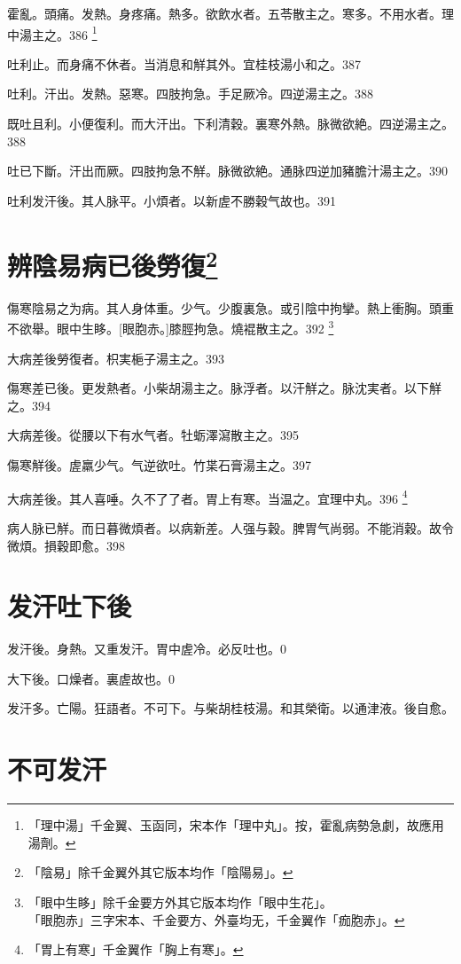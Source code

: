 \documentclass[12pt,twoside,UTF8,b5paper]{ctexbook}
\begin{document}
霍亂。頭痛。发熱。身疼痛。熱多。欲飲水者。五苓散主之。寒多。不用水者。理中湯主之。386
	\footnote{「理中湯」千金翼、玉函同，宋本作「理中丸」。按，霍亂病勢急劇，故應用湯劑。}

吐利止。而身痛不休者。当消息和觧其外。宜桂枝湯小和之。387

吐利。汗出。发熱。惡寒。四肢拘急。手足厥冷。四逆湯主之。388

既吐且利。小便復利。而大汗出。下利清穀。裏寒外熱。脉微欲絶。四逆湯主之。388

吐已下斷。汗出而厥。四肢拘急不觧。脉微欲絶。通脉四逆加豬膽汁湯主之。390

吐利发汗後。其人脉平。小煩者。以新虗不勝穀气故也。391

\chapter{辨陰易病已後勞復\footnote{「陰易」除千金翼外其它版本均作「陰陽易」。}}

傷寒陰易之为病。其人身体重。少气。少腹裏急。或引陰中拘攣。熱上衝胸。頭重不欲舉。眼中生眵。[眼胞赤。]膝脛拘急。燒裩散主之。392
	\footnote{「眼中生眵」除千金要方外其它版本均作「眼中生花」。\\「眼胞赤」三字宋本、千金要方、外臺均无，千金翼作「痂胞赤」。}

大病差後勞復者。枳実梔子湯主之。393

傷寒差已後。更发熱者。小柴胡湯主之。脉浮者。以汗觧之。脉沈実者。以下觧之。394

大病差後。從腰以下有水气者。牡蛎澤瀉散主之。395

傷寒觧後。虗羸少气。气逆欲吐。竹枼石膏湯主之。397

大病差後。其人喜唾。久不了了者。胃上有寒。当温之。宜理中丸。396
	\footnote{「胃上有寒」千金翼作「胸上有寒」。}

病人脉已觧。而日暮微煩者。以病新差。人强与穀。脾胃气尚弱。不能消穀。故令微煩。損穀即愈。398

\chapter{发汗吐下後}

发汗後。身熱。又重发汗。胃中虗冷。必反吐也。0

大下後。口燥者。裏虗故也。0

发汗多。亡陽。狂語者。不可下。与柴胡桂枝湯。和其榮衛。以通津液。後自愈。

\chapter{不可发汗}
\end{document}
